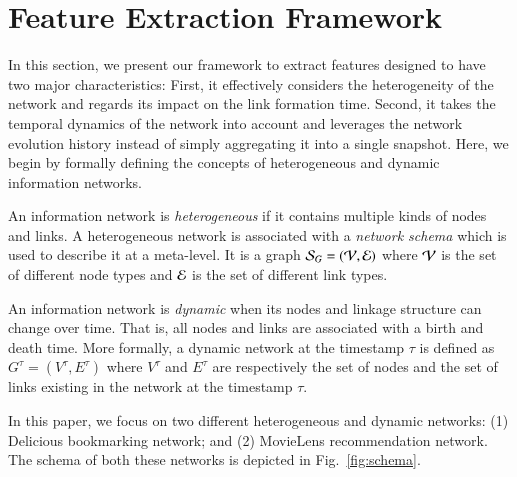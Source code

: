 \section{Feature Extraction Framework}\label{sec:features}

In this section, we present our framework to extract features designed to have two major characteristics: First, it effectively considers the heterogeneity of the network and regards its impact on the link formation time. Second, it takes the temporal dynamics of the network into account and leverages the network evolution history instead of simply aggregating it into a single snapshot. Here, we begin by formally defining the concepts of heterogeneous and dynamic information networks.

\begin{definition}
An information network is \emph{heterogeneous} if it contains multiple kinds of nodes and links.
A heterogeneous network is associated with a \emph{network schema} \cite{sun2011pathsim} which is used to describe it at a meta-level. It is a graph $\mathcal{S}_G=(\mathcal{V}, \mathcal{E})$ where $\mathcal{V}$ is the set of different node types and $\mathcal{E}$ is the set of different link types.
\end{definition}

\begin{definition}
An information network is \emph{dynamic} when its nodes and linkage structure can change over time. That is, all nodes and links are associated with a birth and death time. More formally, a dynamic network at the timestamp $\tau$ is defined as $G^{\tau}=(V^{\tau}, E^{\tau})$ where $V^{\tau}$ and $E^{\tau}$ are respectively the set of nodes and the set of links existing in the network at the timestamp $\tau$.
\end{definition}

In this paper, we focus on two different heterogeneous and dynamic networks: (1) Delicious bookmarking network; and (2) MovieLens recommendation network. The schema of both these networks is depicted in Fig.~\ref{fig:schema}. %


